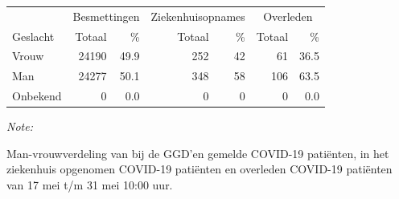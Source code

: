 \documentclass[
  english,
  man,floatsintext]{apa6}
\begin{document}
\begin{table}
\centering\begingroup\fontsize{11}{13}\selectfont

\begin{threeparttable}
\begin{tabular}{lrrrrrr}
\toprule
\multicolumn{1}{c}{ } & \multicolumn{2}{c}{Besmettingen} & \multicolumn{2}{c}{Ziekenhuisopnames} & \multicolumn{2}{c}{Overleden} \\
\cmidrule(l{3pt}r{3pt}){2-3} \cmidrule(l{3pt}r{3pt}){4-5} \cmidrule(l{3pt}r{3pt}){6-7}
Geslacht & Totaal & \% & Totaal & \% & Totaal & \%\\
\midrule
Vrouw & 24190 & 49.9 & 252 & 42 & 61 & 36.5\\
Man & 24277 & 50.1 & 348 & 58 & 106 & 63.5\\
Onbekend & 0 & 0.0 & 0 & 0 & 0 & 0.0\\
\bottomrule
\end{tabular}
\begin{tablenotes}
\item \textit{Note: } 
\item Man-vrouwverdeling van bij de GGD’en gemelde COVID-19 patiënten, in het ziekenhuis opgenomen COVID-19 patiënten en overleden COVID-19 patiënten van 17 mei t/m 31 mei 10:00 uur.
\end{tablenotes}
\end{threeparttable}
\endgroup{}
\end{table}
\newpage
\end{document}

